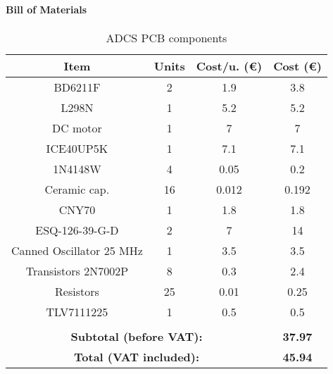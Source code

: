 \begin{appendices}
\paragraph{Bill of Materials}
\begin{table}[H]
\centering
\begin{tabular}{@{}cccc@{}}
\toprule
\textbf{Item}            & \textbf{Units}       & \textbf{Cost/u. (€)} & \textbf{Cost (€)}    \\ \midrule
BD6211F                  & 2                    & 1.9                  & 3.8                  \\
L298N                    & 1                    & 5.2                  & 5.2                  \\
DC motor                 & 1                    & 7                    & 7                    \\
ICE40UP5K                & 1                    & 7.1                  & 7.1                  \\
1N4148W                  & 4                    & 0.05                 & 0.2                  \\
Ceramic cap.             & 16                   & 0.012                & 0.192                \\
CNY70                    & 1                    & 1.8                  & 1.8                  \\
ESQ-126-39-G-D           & 2                    & 7                    & 14                   \\
Canned Oscillator 25 MHz & 1                    & 3.5                  & 3.5                  \\
Transistors 2N7002P      & 8                    & 0.3                  & 2.4                  \\
Resistors                & 25                   & 0.01                 & 0.25                 \\
TLV7111225               & 1                    & 0.5                  & 0.5                  \\
\multicolumn{1}{l}{}     & \multicolumn{1}{l}{} & \multicolumn{1}{l}{} & \multicolumn{1}{l}{} \\
\multicolumn{3}{c}{\textbf{Subtotal (before VAT):}}                    & \textbf{37.97}       \\
\multicolumn{3}{c}{\textbf{Total (VAT included):}}                     & \textbf{45.94}       \\ \bottomrule
\end{tabular}
\caption{\acrshort{ADCS} \acrshort{PCB} components}
\label{adcscomp}
\end{table}


\end{appendices}
